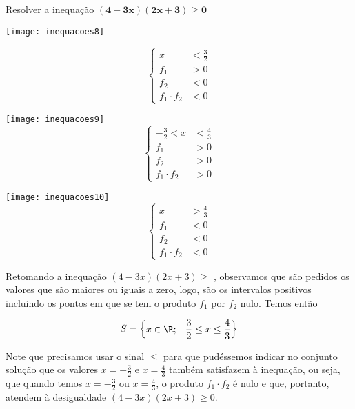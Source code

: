 \begin{example}{Resolver a inequação $\bm{(4-3x)(2x+3)\geq0}$}
\begin{multicols}{3}
\texttt{[image: inequacoes8]}

\begin{equation*}
\left \{
\begin{aligned}
x&<\frac{3}{2}\\
f_1&>0\\
f_2&<0\\
f_1\cdot f_2&<0
\end{aligned}
\right.
\end{equation*}


\texttt{[image: inequacoes9]}
\begin{equation*}
\left \{
\begin{aligned}
-\frac{3}{2}<x&<\frac{4}{3}\\
f_1&>0\\
f_2&>0\\
f_1\cdot f_2&>0
\end{aligned}
\right.
\end{equation*}


\texttt{[image: inequacoes10]}
\begin{equation*}
\left \{
\begin{aligned}
x&>\frac{4}{3}\\
f_1&<0\\
f_2&<0\\
f_1\cdot f_2&<0
\end{aligned}
\right.
\end{equation*}
\end{multicols}
Retomando a inequação $(4-3x)(2x+3)\geq$ , observamos que são pedidos os valores que são maiores ou iguais a zero, logo, são os intervalos positivos incluindo os pontos em que se tem o produto $f_1$ por $f_2$ nulo. Temos então 

\begin{equation*}
S=\left \{
\begin{aligned}
x\in\R;-\frac{3}{2}\leq x\leq\frac{4}{3}
\end{aligned}
\right\}
\end{equation*}
\end{example}

\begin{observation}
Note que precisamos usar o sinal $\leq$ para que pudéssemos indicar no conjunto solução que os valores $x=-\frac{3}{2}$ e $x=\frac{4}{3}$ também satisfazem à inequação, ou seja, que quando temos $x=-\frac{3}{2}$ ou $x=\frac{4}{3}$, o produto $f_1\cdot f_2$ é nulo e que, portanto, atendem à desigualdade $(4-3x)(2x+3)\geq0$.
\end{observation}

